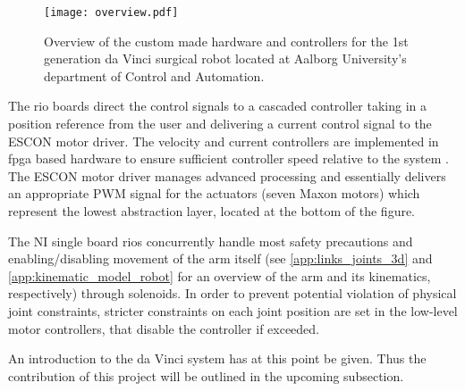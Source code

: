 \begin{figure}[H]
	\hspace*{-5mm}
	\texttt{[image: overview.pdf]}	
	\caption{Overview of the custom made hardware and controllers for the 1st generation da Vinci surgical robot located at Aalborg University's department of Control and Automation.}
	\label{fig:overview}
\end{figure}

The \gls{rio} boards direct the control signals to a cascaded controller taking in a position reference from the user and delivering a current control signal to the ESCON motor driver. The velocity and current controllers are implemented in \gls{fpga} based hardware to ensure sufficient controller speed relative to the system \citep{bib:robot_paper}. The ESCON motor driver manages advanced processing and essentially delivers an appropriate PWM signal for the actuators (seven Maxon motors) which represent the lowest abstraction layer, located at the bottom of the figure.

The NI single board \glspl{rio} concurrently handle most safety precautions and enabling/disabling movement of the arm itself (see \autoref{app:links_joints_3d} and \ref{app:kinematic_model_robot} for an overview of the arm and its kinematics, respectively) through solenoids.
%
In order to prevent potential violation of physical joint constraints, stricter constraints on each joint position are set in the low-level motor controllers, that disable the controller if exceeded.

An introduction to the da Vinci system has at this point be given. Thus the contribution of this project will be outlined in the upcoming subsection.


